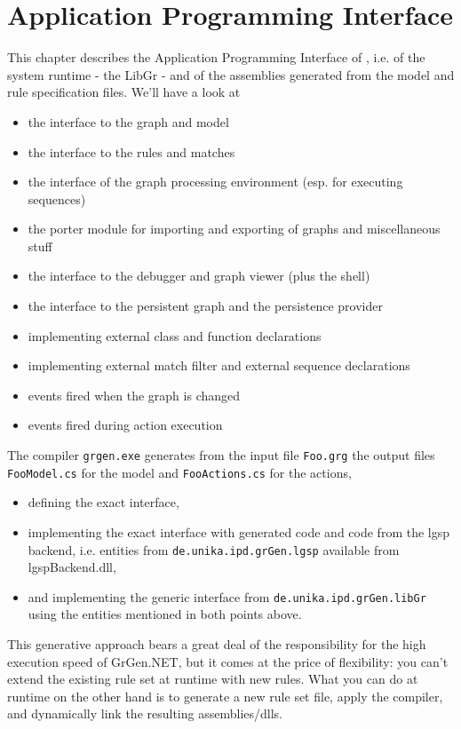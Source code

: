 \chapter{Application Programming Interface} 
\label{cha:api}

This chapter describes the Application Programming Interface of \GrG, i.e. of the system runtime - the LibGr - and of the assemblies generated from the model and rule specification files.
We'll have a look at
\begin{itemize}
\item the interface to the graph and model
\item the interface to the rules and matches
\item the interface of the graph processing environment (esp. for executing sequences)
\item the porter module for importing and exporting of graphs and miscellaneous stuff
\item the interface to the debugger and graph viewer (plus the shell)
\item the interface to the persistent graph and the persistence provider
\item implementing external class and function declarations
\item implementing external match filter and external sequence declarations
\item events fired when the graph is changed
\item events fired during action execution
\end{itemize}

\noindent The compiler \texttt{grgen.exe} generates from the input file \texttt{Foo.grg} the output files \texttt{FooModel.cs} for the model and \texttt{FooActions.cs} for the actions,
\begin{itemize}
\item defining the exact interface, 
\item implementing the exact interface with generated code and code from the lgsp backend, i.e. entities from \texttt{de.unika.ipd.grGen.lgsp} available from lgspBackend.dll, 
\item and implementing the generic interface from \texttt{de.unika.ipd.grGen.libGr} using the entities mentioned in both points above.
\end{itemize}

\noindent This generative approach bears a great deal of the responsibility for the high execution speed of GrGen.NET, but it comes at the price of flexibility: you can't extend the existing rule set at runtime with new rules.
What you can do at runtime on the other hand is to generate a new rule set file, apply the compiler, and dynamically link the resulting assemblies/dlls.

